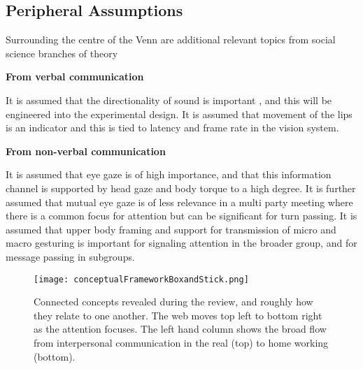             \subsection{Peripheral Assumptions}
                Surrounding the centre of the Venn are additional relevant topics from social science branches of theory\par
                \textbf{From verbal communication}\par
                It is assumed that the directionality of sound is important \cite{Aoki2003}, and this will be engineered into the experimental design. It is assumed that movement of the lips is an indicator and this is tied to latency and frame rate in the vision system.\par
                \textbf{From non-verbal communication}\par
                It is assumed that eye gaze is of high importance, and that this information channel is supported by head gaze and body torque to a high degree. It is further assumed that mutual eye gaze is of less relevance in a multi party meeting where there is a common focus for attention but can be significant for turn passing.
                It is assumed that upper body framing and support for transmission of micro and macro gesturing is important for signaling attention in the broader group, and for message passing in subgroups.
                
                        \begin{figure}[h!] \texttt{[image: conceptualFrameworkBoxandStick.png]} \caption{Connected concepts revealed during the review, and roughly how they relate to one another. The web moves top left to bottom right as the attention focuses. The left hand column shows the broad flow from interpersonal communication in the real (top) to home working (bottom).} \label{fig:conceptualFramework} \end{figure}
